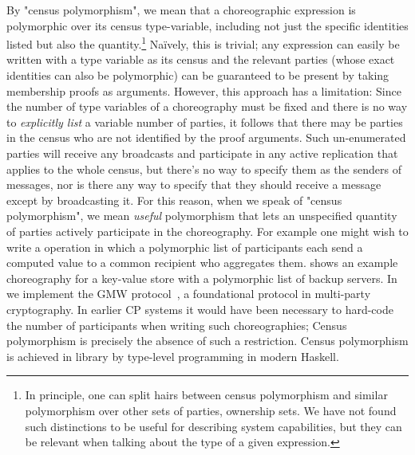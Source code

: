 By "census polymorphism", we mean that a choreographic expression is polymorphic over its census type-variable,
including not just the specific identities listed but also the quantity.\footnote{
    In principle, one can split hairs between census polymorphism and similar polymorphism over other sets of parties, \eg ownership sets.
    We have not found such distinctions to be useful for describing system capabilities,
    but they can be relevant when talking about the type of a given expression.
}
Naïvely, this is trivial; any \MultiChor expression can easily be written with a type variable as its census
and the relevant parties (whose exact identities can also be polymorphic) can be guaranteed to be present by taking
membership proofs as arguments.
However, this approach has a limitation: Since the number of type variables of a choreography must be fixed
and there is no way to \emph{explicitly list} a variable number of parties,
it follows that there may be parties in the census who are not identified by the proof arguments.
Such un-enumerated parties will receive any broadcasts and participate in any active replication that applies to the whole census,
but there's no way to specify them as the senders of messages, nor is there any way to specify that they should receive a message
except by broadcasting it.
For this reason, when we speak of "census polymorphism",
we mean \emph{useful} polymorphism that lets an unspecified quantity of parties actively participate in the choreography.
For example one might wish to write a  operation
in which a polymorphic list of participants each send a computed value to a common recipient who aggregates them.
 shows an example \MultiChor choreography for a key-value store with a polymorphic list of backup servers.
In  we implement the GMW protocol~\cite{goldreich2019play}, a foundational protocol in multi-party cryptography.
In earlier CP systems it would have been necessary to hard-code the number of participants when writing such choreographies;
Census polymorphism is precisely the absence of such a restriction.
Census polymorphism is achieved in \MultiChor library by type-level programming in modern Haskell.

